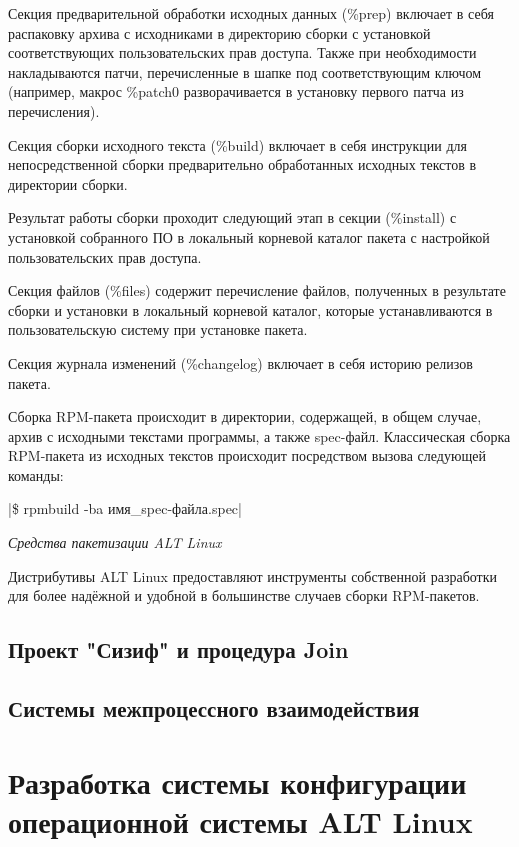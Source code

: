 \documentclass[bachelor, och, pract]{SCWorks}
\begin{document}
Секция предварительной обработки исходных данных (\%prep) включает в себя распаковку архива с исходниками в директорию сборки с установкой соответствующих пользовательских прав доступа.
Также при необходимости накладываются патчи, перечисленные в шапке под соответствующим ключом (например, макрос \%patch0 разворачивается в установку первого патча из перечисления).

Секция сборки исходного текста (\%build) включает в себя инструкции для непосредственной сборки предварительно обработанных исходных текстов в директории сборки.

Результат работы сборки проходит следующий этап в секции (\%install) с установкой собранного ПО в локальный корневой каталог пакета с настройкой пользовательских прав доступа.

Секция файлов (\%files) содержит перечисление файлов, полученных в результате сборки и установки в локальный корневой каталог, которые устанавливаются в пользовательскую систему при установке пакета.

Секция журнала изменений (\%changelog) включает в себя историю релизов пакета.

Сборка RPM-пакета происходит в директории, содержащей, в общем случае, архив с исходными текстами программы, а также spec-файл.
Классическая сборка RPM-пакета из исходных текстов происходит посредством вызова следующей команды:

|\$ rpmbuild -ba имя_spec-файла.spec| %

\textit{Средства пакетизации ALT Linux}

Дистрибутивы ALT Linux предоставляют инструменты собственной разработки для более надёжной и удобной в большинстве случаев сборки RPM-пакетов.

\subsection{Проект "Сизиф" и процедура Join}


\subsection{Системы межпроцессного взаимодействия}

\newpage

\section{Разработка системы конфигурации операционной системы ALT Linux}
\end{document}
